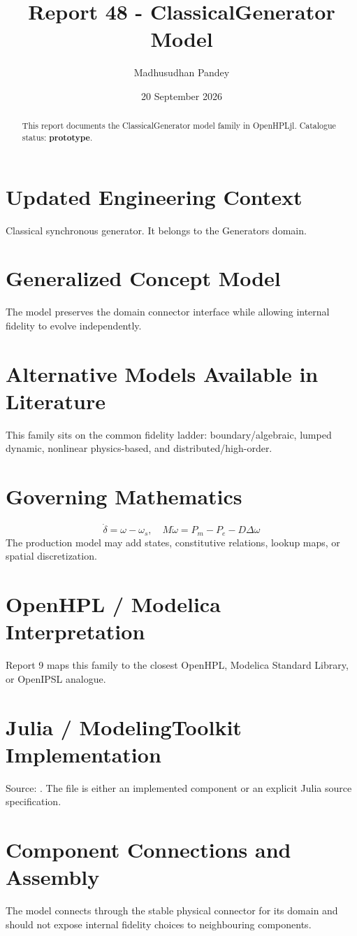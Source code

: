 \documentclass[10pt,a4paper]{article}
\title{Report 48 - ClassicalGenerator Model}
\author{Madhusudhan Pandey}
\date{20 September 2026}
\begin{document}
\maketitle
\begin{abstract}This report documents the ClassicalGenerator model family in OpenHPLjl. Catalogue status: \textbf{prototype}.\end{abstract}
\section{Updated Engineering Context}Classical synchronous generator. It belongs to the Generators domain.
\section{Generalized Concept Model}The model preserves the domain connector interface while allowing internal fidelity to evolve independently.
\section{Alternative Models Available in Literature}This family sits on the common fidelity ladder: boundary/algebraic, lumped dynamic, nonlinear physics-based, and distributed/high-order.
\section{Governing Mathematics}\[\dot\delta=\omega-\omega_s,\quad M\dot\omega=P_m-P_e-D\Delta\omega\]The production model may add states, constitutive relations, lookup maps, or spatial discretization.
\section{OpenHPL / Modelica Interpretation}Report 9 maps this family to the closest OpenHPL, Modelica Standard Library, or OpenIPSL analogue.
\section{Julia / ModelingToolkit Implementation}Source: \texttt{}. The file is either an implemented component or an explicit Julia source specification.
\section{Component Connections and Assembly}The model connects through the stable physical connector for its domain and should not expose internal fidelity choices to neighbouring components.
\end{document}
